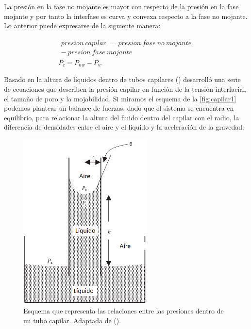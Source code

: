 La presión en la fase no mojante es mayor con respecto de la presión en la fase mojante y por tanto la interfase es curva y convexa respecto a la fase no mojante. Lo anterior puede expresarse de la siguiente manera:

\begin{gather*}
\begin{gathered}
presion~capilar~ = ~presion~fase~no~mojante \\ - ~presion~fase~mojante
\end{gathered} \\
P_{c}=P_{nw}-P_{w}
\end{gather*}


Basado en la altura de líquidos dentro de tubos capilares (\cite{Amix}) desarrolló una serie de ecuaciones que describen la presión capilar en función de la tensión interfacial, el tamaño de poro y la mojabilidad. Si miramos el esquema de la \autoref{fig:capilar1} podemos plantear un balance de fuerzas, dado que el sistema se encuentra en equilibrio, para relacionar la altura del fluido dentro del capilar con el radio, la diferencia de densidades entre el aire y el líquido y la aceleración de la gravedad:

\begin{figure}
    \centering
    \includegraphics[width=0.6\textwidth]{Graphics/capilar1.png}
    \caption[Presión Capilar]{Esquema que representa las relaciones entre las presiones dentro de un tubo capilar. Adaptada de (\cite{Dandekar}).}
    \label{fig:capilar1}
\end{figure}

